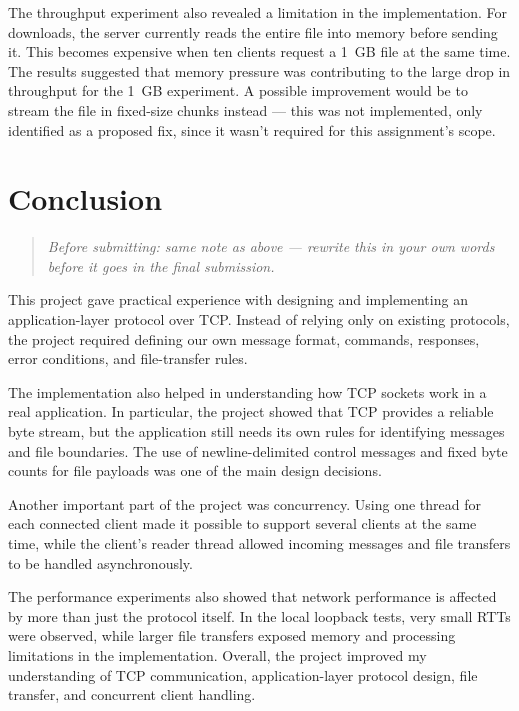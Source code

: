 \documentclass[11pt]{article}
\newenvironment{reviewnote}
  {\begin{quote}\itshape\small}
  {\end{quote}\normalfont\normalsize}
\begin{document}
The throughput experiment also revealed a limitation in the
implementation. For downloads, the server currently reads the entire
file into memory before sending it. This becomes expensive when ten
clients request a 1~GB file at the same time. The results suggested
that memory pressure was contributing to the large drop in throughput
for the 1~GB experiment. A possible improvement would be to stream the
file in fixed-size chunks instead --- this was not implemented, only
identified as a proposed fix, since it wasn't required for this
assignment's scope.

\section{Conclusion}

\begin{reviewnote}
Before submitting: same note as above --- rewrite this in your own
words before it goes in the final submission.
\end{reviewnote}

This project gave practical experience with designing and implementing
an application-layer protocol over TCP. Instead of relying only on
existing protocols, the project required defining our own message
format, commands, responses, error conditions, and file-transfer rules.

The implementation also helped in understanding how TCP sockets work in
a real application. In particular, the project showed that TCP provides
a reliable byte stream, but the application still needs its own rules
for identifying messages and file boundaries. The use of
newline-delimited control messages and fixed byte counts for file
payloads was one of the main design decisions.

Another important part of the project was concurrency. Using one thread
for each connected client made it possible to support several clients
at the same time, while the client's reader thread allowed incoming
messages and file transfers to be handled asynchronously.

The performance experiments also showed that network performance is
affected by more than just the protocol itself. In the local loopback
tests, very small RTTs were observed, while larger file transfers
exposed memory and processing limitations in the implementation.
Overall, the project improved my understanding of TCP communication,
application-layer protocol design, file transfer, and concurrent client
handling.
\end{document}
